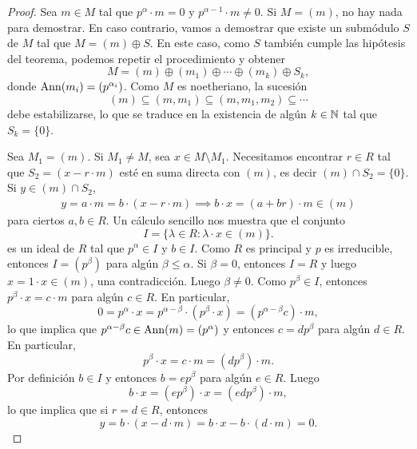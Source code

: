 \begin{proof}
  Sea $m\in M$ tal que $p^{\alpha}\cdot m=0$ y $p^{\alpha-1}\cdot m\ne 0$. Si $M=(m)$, no hay nada para demostrar. En caso contrario,
   vamos a demostrar que existe un submódulo $S$ de $M$ tal que 
	$M=(m)\oplus S$. En este caso, como $S$ también cumple las hipótesis del teorema,
	podemos repetir el procedimiento y obtener
	\[
	M=(m)\oplus (m_1)\oplus\cdots\oplus (m_k)\oplus S_k,
	\]
	donde $\operatorname{Ann}(m_i)=(p^{\alpha_i})$. Como $M$ es noetheriano, la sucesión 
	\[
	(m)\subseteq (m,m_1)\subseteq (m,m_1,m_2)\subseteq\cdots
	\]
	debe estabilizarse, lo que se traduce en la existencia de algún $k\in\mathbb{N}$ tal que $S_k=\{0\}$. 
	
	Sea $M_1=(m)$. Si
	$M_1\ne M$, sea $x\in M\setminus M_1$. Necesitamos encontrar $r\in R$ tal que $S_2=(x-r\cdot m)$ esté en suma directa con $(m)$, es decir 
	$(m)\cap S_2=\{0\}$. Si $y\in (m)\cap S_2$, 
	\begin{gather*}
	y=a\cdot m=b\cdot (x-r\cdot m)\implies 
	b\cdot x=(a+br)\cdot m\in (m)
	\end{gather*}
	para ciertos $a,b\in R$. 
	Un cálculo sencillo nos muestra que el conjunto  
	\[
	I=\{\lambda\in R:\lambda\cdot x\in (m)\}.
	\] 
	es un ideal de $R$ tal que $p^{\alpha}\in I$ y $b\in I$. 
	Como $R$ es principal y $p$ es irreducible,
	entonces $I=(p^\beta)$ para algún $\beta\leq \alpha$. Si $\beta=0$, entonces $I=R$ y luego $x=1\cdot x\in (m)$, una contradicción. Luego $\beta\ne0$. Como
	$p^\beta\in I$, entonces $p^\beta\cdot x=c\cdot m$ para algún $c\in R$. En particular,
	\[
	0=p^{\alpha}\cdot x=p^{\alpha-\beta}\cdot (p^\beta\cdot x)
	=(p^{\alpha-\beta}c)\cdot m,
	\]
	lo que implica que $p^{\alpha-\beta} c\in\operatorname{Ann}(m)=(p^{\alpha})$ y entonces  
	$c=dp^{\beta}$ para algún $d\in R$. En particular, 
	\[
	p^\beta\cdot x=c\cdot m=(dp^{\beta})\cdot m.
	\] 
	Por definición $b\in I$ y entonces $b=ep^{\beta}$ para algún $e\in R$. Luego 
	\[
	b\cdot x=(ep^\beta)\cdot x=(edp^{\beta})\cdot m,
	\]
	lo que implica que si $r=d\in R$, entonces 
	\[
	y=b\cdot (x-d\cdot m)=b\cdot x-b\cdot (d\cdot m)=0.
	\] 
	

\end{proof}
